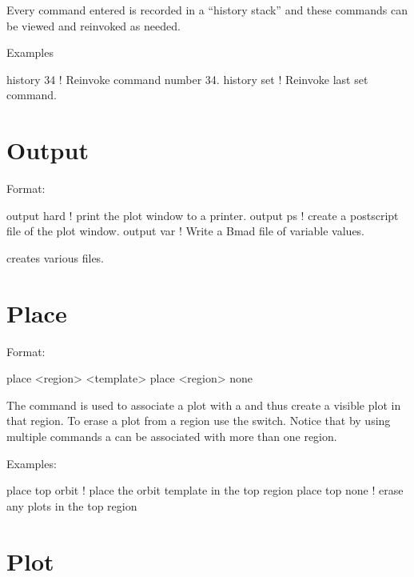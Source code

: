\vskip 0.2in
Every \tao command entered is recorded in a ``history stack'' and
these commands can be viewed and reinvoked as needed. 

Examples
\begin{example}
  history 34   ! Reinvoke command number 34.
  history set  ! Reinvoke last set command.  
\end{example}

\section{Output}
\label{s:output}

Format:
\begin{example}
  output hard     ! print the plot window to a printer.
  output ps       ! create a postscript file of the plot window.
  output var      ! Write a Bmad file of variable values.
\end{example}

\vskip 0.2in
 creates various files.

\section{Place}
\label{s:place}

Format:
\begin{example}
  place <region> <template>
  place <region> none
\end{example}

\vskip 0.2in 
The  command is used to associate a  plot
with a  and thus create a visible plot in that region. To
erase a plot from a region use the  switch. Notice that by
using multiple  commands a  can be associated
with more than one region.

Examples:
\begin{example}
  place top orbit  ! place the orbit template in the top region
  place top none   ! erase any plots in the top region
\end{example}

\section{Plot}
\label{s:plot}

